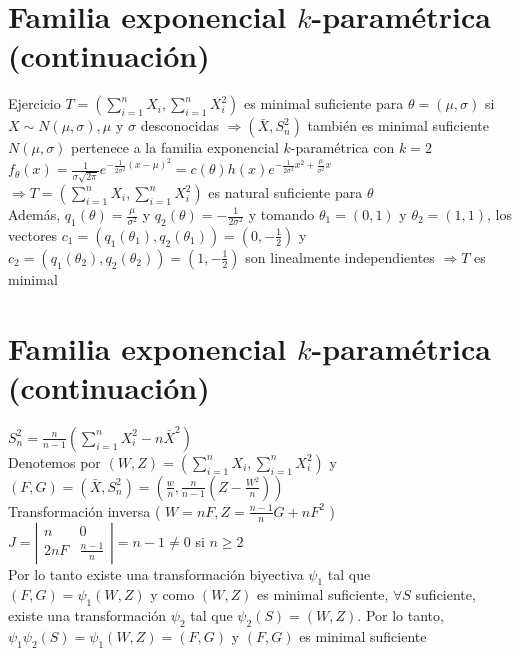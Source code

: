   \section*{Familia exponencial $k$-paramétrica (continuación)}
  Ejercicio $T=\left(\sum_{i=1}^{n} X_{i}, \sum_{i=1}^{n} X_{i}^{2}\right)$ es minimal suficiente para $\theta=(\mu, \sigma)$ si $X \sim N(\mu, \sigma), \mu$ y $\sigma$ desconocidas $\Rightarrow\left(\bar{X}, S_{n}^{2}\right)$ también es minimal suficiente\\
  $N(\mu, \sigma)$ pertenece a la familia exponencial $k$-paramétrica con $k=2$ $f_{\theta}(x)=\frac{1}{\sigma \sqrt{2 \pi}} e^{-\frac{1}{2 \sigma^{2}}(x-\mu)^{2}}=c(\theta) h(x) e^{-\frac{1}{2 \sigma^{2}} x^{2}+\frac{\mu}{\sigma^{2}} x}$\\
  $\Rightarrow T=\left(\sum_{i=1}^{n} X_{i}, \sum_{i=1}^{n} X_{i}^{2}\right)$ es natural suficiente para $\theta$\\
  Además, $q_{1}(\theta)=\frac{\mu}{\sigma^{2}}$ y $q_{2}(\theta)=-\frac{1}{2 \sigma^{2}}$ y tomando $\theta_{1}=(0,1)$ y $\theta_{2}=(1,1)$, los vectores $c_{1}=\left(q_{1}\left(\theta_{1}\right), q_{2}\left(\theta_{1}\right)\right)=\left(0,-\frac{1}{2}\right)$ y $c_{2}=\left(q_{1}\left(\theta_{2}\right), q_{2}\left(\theta_{2}\right)\right)=\left(1,-\frac{1}{2}\right)$ son linealmente independientes $\Rightarrow T$ es minimal
  
  \section*{Familia exponencial $k$-paramétrica (continuación)}
  $S_{n}^{2}=\frac{n}{n-1}\left(\sum_{i=1}^{n} X_{i}^{2}-n \bar{X}^{2}\right)$\\
  Denotemos por $(W, Z)=\left(\sum_{i=1}^{n} X_{i}, \sum_{i=1}^{n} X_{i}^{2}\right)$ y\\
  $(F, G)=\left(\bar{X}, S_{n}^{2}\right)=\left(\frac{w}{n}, \frac{n}{n-1}\left(Z-\frac{W^{2}}{n}\right)\right)$\\
  Transformación inversa ( $W=n F, Z=\frac{n-1}{n} G+n F^{2}$ )\\
  $J=\left|\begin{array}{ll}n & 0 \\ 2 n F & \frac{n-1}{n}\end{array}\right|=n-1 \neq 0$ si $n \geq 2$\\
  Por lo tanto existe una transformación biyectiva $\psi_{1}$ tal que $(F, G)=\psi_{1}(W, Z)$ y como $(W, Z)$ es minimal suficiente, $\forall S$ suficiente, existe una transformación $\psi_{2}$ tal que $\psi_{2}(S)=(W, Z)$. Por lo tanto, $\psi_{1} \psi_{2}(S)=\psi_{1}(W, Z)=(F, G)$ y $(F, G)$ es minimal suficiente
  
